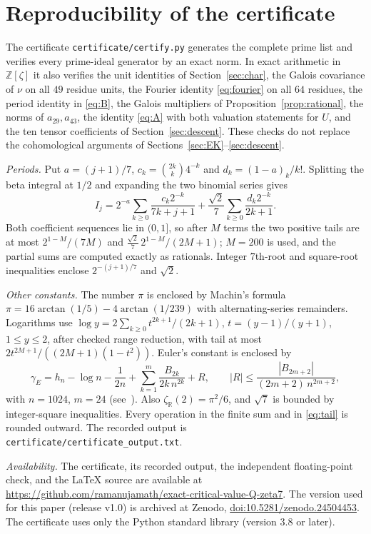 \documentclass[11pt]{amsart}
\theoremstyle{remark}
\theoremstyle{definition}
\newcommand{\Z}{\mathbb{Z}}
\newcommand{\R}{\mathbb{R}}
\begin{document}
\appendix
\section{Reproducibility of the certificate}\label{app:repro}

The certificate \texttt{certificate/certify.py} generates the complete prime list and verifies every prime-ideal generator by an exact norm. In exact arithmetic in $\Z[\zeta]$ it also verifies the unit identities of Section~\ref{sec:char}, the Galois covariance of $\nu$ on all $49$ residue units, the Fourier identity \eqref{eq:fourier} on all $64$ residues, the period identity in \eqref{eq:B}, the Galois multipliers of Proposition~\ref{prop:rational}, the norms of $a_{29},a_{43}$, the identity \eqref{eq:A} with both valuation statements for $U$, and the ten tensor coefficients of Section~\ref{sec:descent}. These checks do not replace the cohomological arguments of Sections~\ref{sec:EK}--\ref{sec:descent}.

\emph{Periods.} Put $a=(j+1)/7$, $c_k=\binom{2k}{k}4^{-k}$ and $d_k=(1-a)_k/k!$. Splitting the beta integral at $1/2$ and expanding the two binomial series gives
\[
I_j=2^{-a}\sum_{k\ge0}\frac{c_k2^{-k}}{7k+j+1}+\frac{\sqrt2}{7}\sum_{k\ge0}\frac{d_k2^{-k}}{2k+1}.
\]
Both coefficient sequences lie in $(0,1]$, so after $M$ terms the two positive tails are at most $2^{1-M}/(7M)$ and $\frac{\sqrt2}{7}\,2^{1-M}/(2M+1)$; $M=200$ is used, and the partial sums are computed exactly as rationals. Integer $7$th-root and square-root inequalities enclose $2^{-(j+1)/7}$ and $\sqrt2$.

\emph{Other constants.} The number $\pi$ is enclosed by Machin's formula $\pi=16\arctan(1/5)-4\arctan(1/239)$ with alternating-series remainders. Logarithms use $\log y=2\sum_{k\ge0}t^{2k+1}/(2k+1)$, $t=(y-1)/(y+1)$, $1\le y\le2$, after checked range reduction, with tail at most $2t^{2M+1}/((2M+1)(1-t^2))$. Euler's constant is enclosed by
\[
\gamma_E=h_n-\log n-\frac{1}{2n}+\sum_{k=1}^{m}\frac{B_{2k}}{2k\,n^{2k}}+R,\qquad |R|\le\frac{|B_{2m+2}|}{(2m+2)\,n^{2m+2}},
\]
with $n=1024$, $m=24$ (see~\cite[\S5.11]{DLMF}). Also $\zeta_\R(2)=\pi^2/6$, and $\sqrt7$ is bounded by integer-square inequalities. Every operation in the finite sum and in \eqref{eq:tail} is rounded outward. The recorded output is \texttt{certificate/certificate\_output.txt}.

\emph{Availability.} The certificate, its recorded output, the independent floating-point check, and the \LaTeX{} source are available at \url{https://github.com/ramanujamath/exact-critical-value-Q-zeta7}. The version used for this paper (release v1.0) is archived at Zenodo, \href{https://doi.org/10.5281/zenodo.24504453}{doi:10.5281/zenodo.24504453}. The certificate uses only the Python standard library (version $3.8$ or later).
\end{document}

